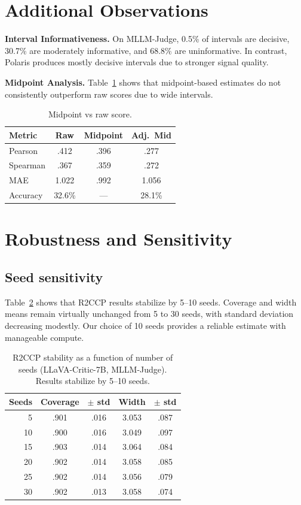 \documentclass{article}
\begin{document}
\section{Additional Observations}

\textbf{Interval Informativeness.}
On MLLM-Judge, 0.5\% of intervals are decisive, 30.7\% are moderately informative, and 68.8\% are uninformative. In contrast, Polaris produces mostly decisive intervals due to stronger signal quality.

\textbf{Midpoint Analysis.}
Table~\ref{tab:midpoint} shows that midpoint-based estimates do not consistently outperform raw scores due to wide intervals.

\begin{table}[t]
\centering
\caption{Midpoint vs raw score.}
\label{tab:midpoint}
\small
\begin{tabular}{lccc}
\toprule
\textbf{Metric} & \textbf{Raw} & \textbf{Midpoint} & \textbf{Adj.\ Mid} \\
\midrule
Pearson & .412 & .396 & .277 \\
Spearman & .367 & .359 & .272 \\
MAE & 1.022 & .992 & 1.056 \\
Accuracy & 32.6\% & --- & 28.1\% \\
\bottomrule
\end{tabular}
\end{table}

\section{Robustness and Sensitivity}

\subsection{Seed sensitivity}
\label{app:seeds}

Table~\ref{tab:ablation_seeds} shows that R2CCP results stabilize by 5--10 seeds. Coverage and width means remain virtually unchanged from 5 to 30 seeds, with standard deviation decreasing modestly. Our choice of 10 seeds provides a reliable estimate with manageable compute.

\begin{table}[t]
\centering
\caption{R2CCP stability as a function of number of seeds (LLaVA-Critic-7B, MLLM-Judge). Results stabilize by 5--10 seeds.}
\label{tab:ablation_seeds}
\small
\begin{tabular}{rcccc}
\toprule
\textbf{Seeds} & \textbf{Coverage} & \textbf{$\pm$ std} & \textbf{Width} & \textbf{$\pm$ std} \\
\midrule
5 & .901 & .016 & 3.053 & .087 \\
10 & .900 & .016 & 3.049 & .097 \\
15 & .903 & .014 & 3.064 & .084 \\
20 & .902 & .014 & 3.058 & .085 \\
25 & .902 & .014 & 3.056 & .079 \\
30 & .902 & .013 & 3.058 & .074 \\
\bottomrule
\end{tabular}
\end{table}
\end{document}
